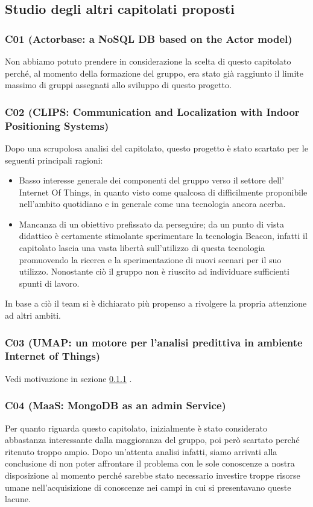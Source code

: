 \documentclass[a4paper,11pt]{article}
\begin{document}
\newpage

\subsection{Studio degli altri capitolati proposti}

\subsubsection{C01 (Actorbase: a NoSQL DB based on the Actor model)}
\label{c1}
Non abbiamo potuto prendere in considerazione la scelta di questo capitolato perché, al momento della formazione del gruppo, era stato già raggiunto il limite massimo di gruppi assegnati allo sviluppo di questo progetto. 

\subsubsection{C02 (CLIPS: Communication and Localization with Indoor Positioning Systems)}
Dopo una scrupolosa analisi del capitolato, questo progetto è stato scartato per le seguenti principali ragioni: 
\begin{itemize}
\item Basso interesse generale dei componenti del gruppo verso il settore dell' Internet Of Things, in quanto visto come qualcosa di difficilmente proponibile nell'ambito quotidiano  e in generale come una tecnologia ancora acerba.
\item Mancanza di un obiettivo prefissato da perseguire; da un punto di vista didattico è certamente stimolante sperimentare la tecnologia Beacon, infatti il capitolato lascia una vasta libertà sull'utilizzo di questa tecnologia promuovendo la ricerca e la sperimentazione di nuovi scenari per il suo utilizzo. Nonostante ciò il gruppo non è riuscito ad individuare sufficienti spunti di lavoro.
\end{itemize}
In base a ciò il team si è dichiarato più propenso a rivolgere la propria attenzione ad altri ambiti.

\subsubsection{C03 (UMAP: un motore per l'analisi predittiva in ambiente Internet of Things)}
Vedi motivazione in sezione \ref{c1} .

\subsubsection{C04 (MaaS: MongoDB as an admin Service)}
Per quanto riguarda questo capitolato, inizialmente è stato considerato abbastanza interessante dalla maggioranza del gruppo, poi però scartato perché ritenuto troppo ampio. Dopo un'attenta analisi infatti, siamo arrivati alla conclusione di non poter affrontare il problema con le sole conoscenze a nostra disposizione al momento perché sarebbe stato necessario investire troppe risorse umane nell'acquisizione di conoscenze nei campi in cui si presentavano queste lacune.
\end{document}
